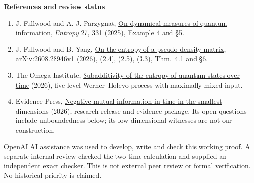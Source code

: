 \documentclass[11pt]{article}
\begin{document}
\textbf{References and review status}
\begin{enumerate}
\item J. Fullwood and A. J. Parzygnat, \href{https://doi.org/10.3390/e27040331}{On dynamical measures of quantum information}, \emph{Entropy} 27, 331 (2025), Example 4 and \S5.
\item J. Fullwood and B. Yang, \href{https://arxiv.org/html/2608.28946v1}{On the entropy of a pseudo-density matrix}, arXiv:2608.28946v1 (2026), (2.4), (2.5), (3.3), Thm.~4.1 and \S6.
\item The Omega Institute, \href{https://www.trureturing.org/research/fullwood-parzygnat-2025-states-over-time-subadditivity/}{Subadditivity of the entropy of quantum states over time} (2026), five-level Werner--Holevo process with maximally mixed input.
\item Evidence Press, \href{https://evidencepress.org/releases/negative-mutual-information-in-time/}{Negative mutual information in time in the smallest dimensions} (2026), research release and evidence package. Its open questions include unboundedness below; its low-dimensional witnesses are not our construction.
\end{enumerate}
OpenAI AI assistance was used to develop, write and check this working proof. A separate internal review checked the two-time calculation and supplied an independent exact checker. This is not external peer review or formal verification. No historical priority is claimed.
\end{document}
